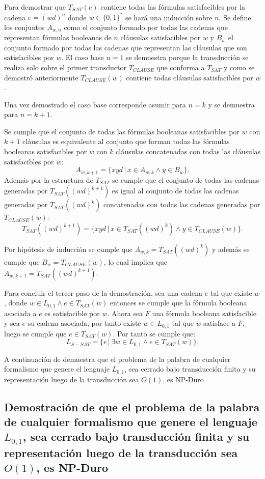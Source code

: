 \documentclass[12pt]{article}
\begin{document}
Para demostrar que $T_{SAT}(e)$ contiene todas las fórmulas satisfacibles por la cadena $e=(wd)^n$ donde 
$w\in\{0,1\}^*$ se hará una inducción sobre $n$. Se define los conjuntos $A_{w,n}$ como el conjunto 
formado por todas las cadenas que representan fórmulas booleanas de $n$ cláusulas satisfacibles por 
$w$ y $B_w$ el conjunto formado por todas las cadenas que representan las cláusulas que son satisfacibles 
por $w$. El caso base $n=1$ se demuestra porque la transducción se realiza solo sobre el primer transductor 
$T_{CLAUSE}$ que conforma a $T_{SAT}$ y como se demostró anteriormente $T_{CLAUSE}(w)$ contiene todas cláusulas satisfacibles por $w$.  

Una vez demostrado el caso base corresponde asumir para $n=k$ y se demuestra para $n=k+1$. 

Se cumple que 
el conjunto de todas las fórmulas booleanas satisfacibles por $w$ con $k+1$ cláusulas es equivalente 
al conjunto que forman todas las fórmulas booleanas satisfacibles por $w$ con $k$ cláusulas concatenadas con todas 
las cláusulas satisfacibles por $w$:
$$A_{w,k+1}=\{xyd\,|\,x\in A_{w,k} \wedge y\in B_w\}.$$
Además por la estructura de $T_{SAT}$ se cumple que el conjunto de todas las cadenas
generadas por $T_{SAT}((wd)^{k+1})$ es igual al conjunto de todas las cadenas 
generadas por $T_{SAT}((wd)^{k})$ concatenadas con todas las cadenas generadas por $T_{CLAUSE}(w)$:  
$$T_{SAT}((wd)^{k+1})=\{xyd\,|\,x\in T_{SAT}((wd)^{k}) \wedge y\in T_{CLAUSE}(w)\}.$$

Por hipótesis de inducción se cumple que $A_{w,k}=T_{SAT}((wd)^{k})$ y además se cumple que $B_w=T_{CLAUSE}(w)$, lo cual implica que $A_{w,k+1}=T_{SAT}((wd)^{k+1})$.

Para concluir el tercer paso de la demostración, sea una cadena $e$ tal que existe $w$, donde $w \in L_{0,1} \wedge e \in T_{SAT}(w)$ entonces 
se cumple que la fórmula booleana asociada a $e$ es satisfacible por $w$. Ahora sea $F$ una fórmula 
booleana satisfacible y sea $e$ su cadena asociada, por tanto existe $w\in L_{0,1}$ tal que $w$ satisface a $F$, luego se cumple que $e\in T_{SAT}(w)$. Por tanto se cumple que:
$$L_{S-SAT} = \{e\,|\,\exists w \in L_{0,1} \wedge e \in T_{SAT}(w) \}.$$

A continuación de demuestra que el problema de la palabra de cualquier formalismo que genere el lenguaje $L_{0,1}$, sea cerrado bajo transducción finita y su representación luego de la transducción sea $O(1)$, es NP-Duro


\subsection{Demostración de que el problema de la palabra de cualquier formalismo que genere el lenguaje $L_{0,1}$, sea cerrado bajo transducción finita y su representación luego de la transducción sea $O(1)$, es NP-Duro}
\end{document}
